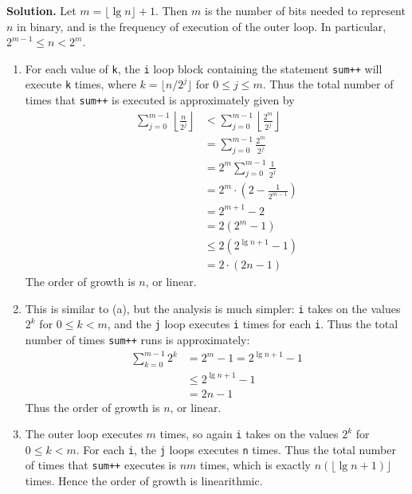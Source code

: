 \documentclass[12pt, a4paper]{article}
\newenvironment{sol}[1][Solution]
{\par\medskip\noindent \textbf{#1.} }
{\medskip}
\begin{document}
	\begin{sol}
		Let $m = \lfloor \lg n \rfloor + 1$. Then $m$ is the number of bits needed
		to represent $n$ in binary, and is the frequency of execution of the outer loop.
		In particular, $2^{m-1}\leq n < 2^m$.
		\begin{enumerate}[label=(\alph*)]
			\item For each value of \texttt{k}, the \texttt{i} loop block containing the statement
			\texttt{sum++} will execute \texttt{k} times, where $k = \lfloor n / 2^j\rfloor$
			for $0\leq j\leq m$. Thus the total number of times that \texttt{sum++} is executed
			is approximately given by
			\begin{align*}
				\sum_{j=0}^{m-1}\left\lfloor \frac{n}{2^j}\right\rfloor
				&<  \sum_{j=0}^{m-1}\left\lfloor\frac{2^m}{2^j}\right\rfloor\\
				&=\sum_{j=0}^{m-1}\frac{2^m}{2^j}\\
				&=2^m\sum_{j=0}^{m-1}\frac{1}{2^j}\\
				&=2^m\cdot \left(2-\frac{1}{2^{m-1}}\right)\\
				&=2^{m+1} - 2\\
				&=2(2^m - 1)\\
				&\leq 2(2^{\lg n + 1} - 1)\\
				&=2\cdot (2n -1 )
			\end{align*}
			The order of growth is $n$, or linear.
			\item This is similar to (a), but the analysis is much simpler:
			\texttt{i} takes on the values $2^k$ for $0\leq k<m$, and the \texttt{j} loop
			executes \texttt{i} times for each \texttt{i}. Thus the total number of times
			\texttt{sum++} runs is approximately:
			\begin{align*}
				\sum_{k=0}^{m - 1}2^k &= 2^m - 1 = 2^{\lg n + 1} - 1 \\
				&\leq 2^{\lg n + 1} - 1\\
				&= 2n - 1
			\end{align*}
			Thus the order of growth is $n$, or linear.
			\item The outer loop executes $m$ times, so again \texttt{i} takes on the
			values $2^k$ for $0\leq k<m$. For each \texttt{i}, the \texttt{j} loops executes \texttt{n}
			times. Thus the total number of times that \texttt{sum++} executes is $nm$ times,
			which is exactly $n(\lfloor \lg n + 1)\rfloor$ times. Hence the order of growth is linearithmic.
		\end{enumerate}
	\end{sol}
\end{document}
